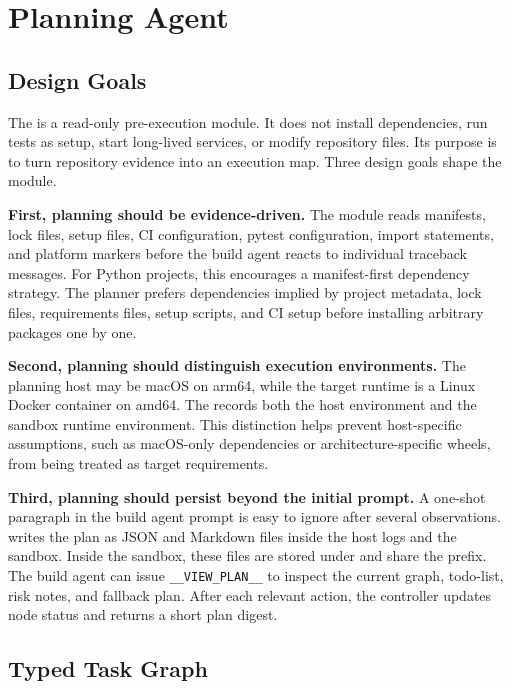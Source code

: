 \section{Planning Agent}

\subsection{Design Goals}

The \planner is a read-only pre-execution module.
It does not install dependencies, run tests as setup, start long-lived services, or modify repository files.
Its purpose is to turn repository evidence into an execution map.
Three design goals shape the module.

\textbf{First, planning should be evidence-driven.}
The module reads manifests, lock files, setup files, CI configuration, pytest configuration, import statements, and platform markers before the build agent reacts to individual traceback messages.
For Python projects, this encourages a manifest-first dependency strategy.
The planner prefers dependencies implied by project metadata, lock files, requirements files, setup scripts, and CI setup before installing arbitrary packages one by one.

\textbf{Second, planning should distinguish execution environments.}
The planning host may be macOS on arm64, while the target runtime is a Linux Docker container on amd64.
The \planner records both the host environment and the sandbox runtime environment.
This distinction helps prevent host-specific assumptions, such as macOS-only dependencies or architecture-specific wheels, from being treated as target requirements.

\textbf{Third, planning should persist beyond the initial prompt.}
A one-shot paragraph in the build agent prompt is easy to ignore after several observations.
\tool writes the plan as JSON and Markdown files inside the host logs and the sandbox.
Inside the sandbox, these files are stored under  and share the  prefix.
The build agent can issue \texttt{\_\_VIEW\_PLAN\_\_} to inspect the current graph, todo-list, risk notes, and fallback plan.
After each relevant action, the controller updates node status and returns a short plan digest.

\subsection{Typed Task Graph}

